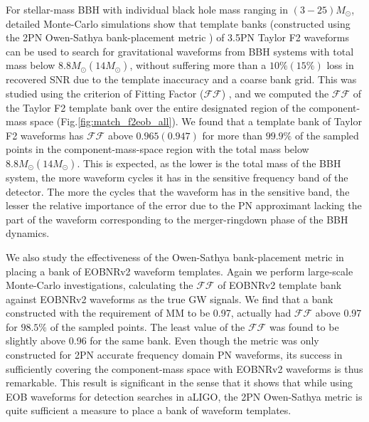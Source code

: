 \documentclass[aps,
prd,
amsmath,
amssymb,
twocolumn,
floatfix,
groupedaddress]{revtex4-1}
\newcommand{\FF}{\mathcal{FF}}
\newcommand{\MM}{\mathrm{MM}}
\begin{document}
For stellar-mass BBH with individual black hole mass ranging in $(3-25)M_{\odot}$, detailed Monte-Carlo simulations show that template banks (constructed using the 2PN Owen-Sathya bank-placement metric \citep{SathyaMetric2PN}) of 3.5PN Taylor F2 waveforms can be used to search for gravitational waveforms  from BBH systems with total mass below $8.8M_{\odot} (14M_{\odot})$, without suffering more than a $10\% (15\%)$ loss in recovered SNR due to the template inaccuracy and a coarse bank grid. This was studied using the criterion of Fitting Factor ($\FF$) \citep{FittingFactorApostolatos}, and we computed the $\FF$ of the Taylor F2 template bank over the entire designated region of the component-mass space (Fig.\ref{fig:match_f2eob_all}). We found that a template bank of Taylor F2 waveforms has $\FF$ above $0.965 (0.947)$ for more than $99.9\%$ of the sampled points in the component-mass-space region with the total mass below $8.8M_{\odot} (14M_{\odot})$. This is expected, as the lower is the total mass of the BBH system, the more waveform cycles it has in the sensitive frequency band of the detector. The more the cycles that the waveform has in the sensitive band, the lesser the relative importance of the error due to the PN approximant lacking the part of the waveform corresponding to the merger-ringdown phase of the BBH dynamics.

We also study the effectiveness of the Owen-Sathya bank-placement metric in placing a bank of EOBNRv2 waveform templates. Again we perform large-scale Monte-Carlo investigations, calculating the $\FF$ of EOBNRv2 template bank against EOBNRv2 waveforms as the true GW signals. We find that a bank constructed with the requirement of $\MM$ to be 0.97, actually had $\FF$ above 0.97 for $98.5\%$ of the sampled points. The least value of the $\FF$ was found to be slightly above 0.96 for the same bank. Even though the metric was only constructed for 2PN accurate frequency domain PN waveforms, its success in sufficiently covering the component-mass space with EOBNRv2 waveforms is thus remarkable. This result is significant in the sense that it shows that while using EOB waveforms for detection searches in aLIGO, the 2PN Owen-Sathya metric is quite sufficient a measure to place a bank of waveform templates.
\end{document}
